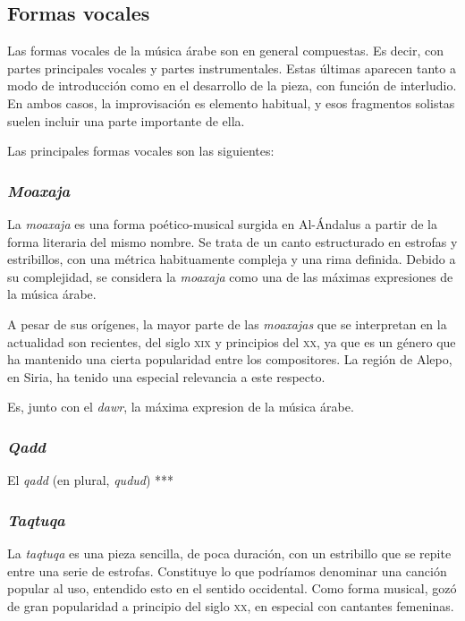 \subsection{Formas vocales}

    Las formas vocales de la música árabe son en general compuestas. Es decir, con partes principales vocales y partes instrumentales. Estas últimas aparecen tanto a modo de introducción como en el desarrollo de la pieza, con función de interludio. En ambos casos, la improvisación es elemento habitual, y esos fragmentos solistas suelen incluir una parte importante de ella.

    Las principales formas vocales son las siguientes:

    \subsubsection{\emph{Moaxaja}}

    La \emph{moaxaja} es una forma poético-musical surgida en Al-Ándalus a partir de la forma literaria del mismo nombre. Se trata de un canto estructurado en estrofas y estribillos, con una métrica habituamente compleja y una rima definida. Debido a su complejidad, se considera la \emph{moaxaja} como una de las máximas expresiones de la música árabe.

    A pesar de sus orígenes, la mayor parte de las \emph{moaxajas} que se interpretan en la actualidad son recientes, del siglo \textsc{xix} y principios del \textsc{xx}, ya que es un género que ha mantenido una cierta popularidad entre los compositores. La región de Alepo, en Siria, ha tenido una especial relevancia a este respecto.

    Es, junto con el \emph{dawr}, la máxima expresion de la música árabe.


    \subsubsection{\emph{Qadd}}

    El \emph{qadd} (en plural, \emph{qudud})
    ***

    \subsubsection{\emph{Taqtuqa}}

    La \emph{taqtuqa} es una pieza sencilla, de poca duración, con un estribillo que se repite entre una serie de estrofas. Constituye lo que podríamos denominar una canción popular al uso, entendido esto en el sentido occidental. Como forma musical, gozó de gran popularidad a principio del siglo \textsc{xx}, en especial con cantantes femeninas.

